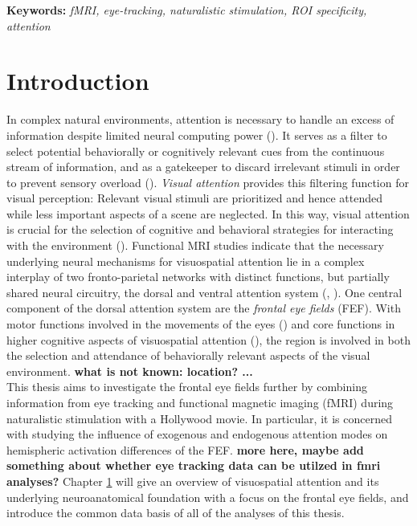 \documentclass[a4paper, 12pt]{scrreprt}
\begin{document}
\bigskip

\textbf{Keywords:} \textit{fMRI, eye-tracking, naturalistic stimulation, ROI specificity, attention}



\chapter{Introduction}\label{section:intro}

In complex natural environments, attention is necessary to handle an excess of information despite limited neural computing power (\cite{carrasco2011visual}). It serves as a filter to select potential behaviorally or cognitively relevant cues from the continuous stream of information, and as a gatekeeper to discard irrelevant stimuli in order to prevent sensory overload (\cite{bellebaum2012neuropsych}). \textit{Visual attention} provides this filtering function for visual perception: Relevant visual stimuli are prioritized and hence attended while less important aspects of a scene are neglected. In this way, visual attention is crucial for the selection of cognitive and behavioral strategies for interacting with the environment (\cite{siegelbaum2000neuro}).\newline
Functional MRI studies indicate that the necessary underlying neural mechanisms for visuospatial attention lie in a complex interplay of two fronto-parietal networks with distinct functions, but partially shared neural circuitry, the dorsal and ventral attention system (\cite{corbetta2002control}, \cite{vossel2014dorsal}). 
One central component of the dorsal attention system are the \textit{frontal eye fields} (FEF). With motor functions involved in the movements of the eyes (\cite{krauzlis2014eye}) and core functions in higher cognitive aspects of visuospatial attention (\cite{vernet2014corrigendum}), the region is involved in both the selection and attendance of behaviorally relevant aspects of the visual environment. \textbf{what is not known: location? ...}\\ 
This thesis aims to investigate the frontal eye fields further by combining information from eye tracking and functional magnetic imaging (fMRI) during naturalistic stimulation with a Hollywood movie. In particular, it is concerned with studying the influence of exogenous and endogenous attention modes on hemispheric activation differences of the FEF. \textbf{more here, maybe add something about whether eye tracking data can be utilzed in fmri analyses?}
Chapter \ref{section:intro} will give an overview of visuospatial attention and its underlying neuroanatomical foundation with a focus on the frontal eye fields, and introduce the common data basis of all of the analyses of this thesis. \\
\end{document}
